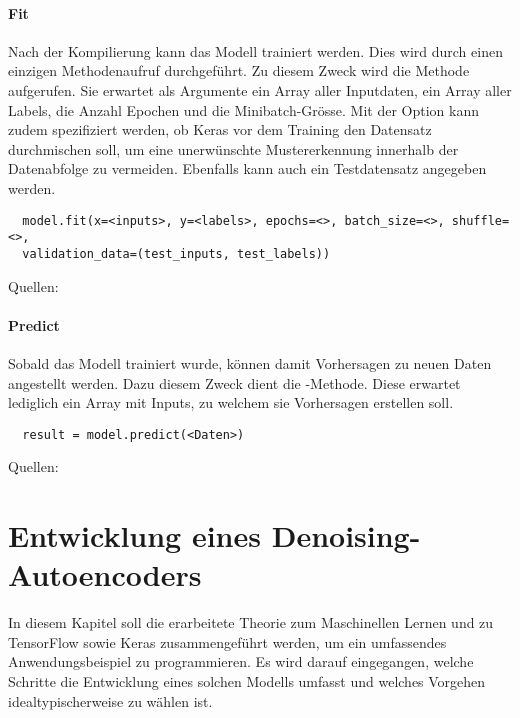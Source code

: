\subsubsection{Fit}
Nach der Kompilierung kann das Modell trainiert werden. Dies wird durch einen
einzigen Methodenaufruf durchgeführt. Zu diesem Zweck wird die  Methode aufgerufen.
Sie erwartet als Argumente ein Array aller Inputdaten, ein Array
aller Labels, die Anzahl Epochen und die Minibatch-Grösse.
Mit der Option  kann zudem spezifiziert werden, ob Keras vor dem
Training den Datensatz durchmischen soll, um eine unerwünschte Mustererkennung innerhalb der
Datenabfolge zu vermeiden.
Ebenfalls kann auch ein Testdatensatz angegeben werden.
\begin{verbatim}
  model.fit(x=<inputs>, y=<labels>, epochs=<>, batch_size=<>, shuffle=<>,
  validation_data=(test_inputs, test_labels))
\end{verbatim}
\para{}
Quellen: \cite{net:keras_docs} \cite{net:tf_docs}

\subsubsection{Predict}
Sobald das Modell trainiert wurde, können damit Vorhersagen zu neuen Daten
angestellt werden. Dazu diesem Zweck dient die -Methode. Diese
erwartet lediglich ein Array mit Inputs, zu welchem sie Vorhersagen erstellen soll.

\begin{verbatim}
  result = model.predict(<Daten>)
\end{verbatim}
\para{}
Quellen: \cite{net:keras_docs} \cite{net:tf_docs}



\chapter{Entwicklung eines Denoising-Autoencoders}
In diesem Kapitel soll die erarbeitete Theorie zum Maschinellen Lernen und zu
TensorFlow sowie Keras zusammengeführt werden, um ein umfassendes
Anwendungsbeispiel zu programmieren.
Es wird darauf eingegangen, welche Schritte die
Entwicklung eines solchen Modells umfasst und welches Vorgehen
idealtypischerweise zu wählen ist.

